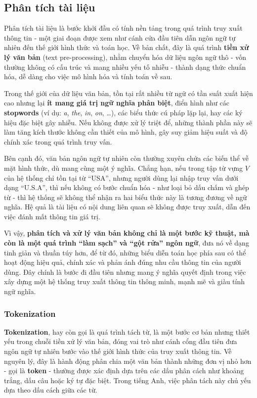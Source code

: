 \subsection{Phân tích tài liệu}
Phân tích tài liệu là bước khởi đầu có tính nền tảng trong quá trình truy xuất thông tin - một giai đoạn được xem như cánh cửa đầu tiên dẫn ngôn ngữ tự nhiên đến thế giới hình thức và toán học. Về bản chất, đây là quá trình \textbf{tiền xử lý văn bản} (text pre-processing), nhằm chuyển hóa dữ liệu ngôn ngữ thô - vốn thường không có cấu trúc và mang nhiều yếu tố nhiễu - thành dạng thức chuẩn hóa, dễ dàng cho việc mô hình hóa và tính toán về sau.

Trong thế giới của dữ liệu văn bản, tồn tại rất nhiều từ ngữ có tần suất xuất hiện cao nhưng lại \textbf{ít mang giá trị ngữ nghĩa phân biệt}, điển hình như các \textbf{stopwords} (ví dụ: \textit{a}, \textit{the}, \textit{in}, \textit{on}, \dots), các biểu thức cú pháp lặp lại, hay các ký hiệu đặc biệt gây nhiễu. Nếu không được xử lý triệt để, những thành phần này sẽ làm tăng kích thước không cần thiết của mô hình, gây suy giảm hiệu suất và độ chính xác trong quá trình truy vấn.

Bên cạnh đó, văn bản ngôn ngữ tự nhiên còn thường xuyên chứa các biến thể về mặt hình thức, dù mang cùng một ý nghĩa. Chẳng hạn, nếu trong tập từ vựng \(V\) của hệ thống chỉ tồn tại từ ``USA'', nhưng người dùng lại nhập truy vấn dưới dạng ``U.S.A'', thì nếu không có bước chuẩn hóa - như loại bỏ dấu chấm và ghép từ - thì hệ thống sẽ không thể nhận ra hai biểu thức này là tương đương về ngữ nghĩa. Hệ quả là tài liệu có nội dung liên quan sẽ không được truy xuất, dẫn đến việc đánh mất thông tin giá trị.

Vì vậy, \textbf{phân tích và xử lý văn bản không chỉ là một bước kỹ thuật, mà còn là một quá trình ``làm sạch'' và ``gột rửa'' ngôn ngữ}, đưa nó về dạng tinh giản và thuần túy hơn, để từ đó, những biểu diễn toán học phía sau có thể hoạt động hiệu quả, chính xác và phản ánh đúng nhu cầu thông tin của người dùng. Đây chính là bước đi đầu tiên nhưng mang ý nghĩa quyết định trong việc xây dựng một hệ thống truy xuất thông tin thông minh, mạnh mẽ và giàu tính ngữ nghĩa.

\subsubsection{Tokenization}
\textbf{Tokenization}, hay còn gọi là quá trình tách từ, là một bước cơ bản nhưng thiết yếu trong chuỗi tiền xử lý văn bản, đóng vai trò như cánh cổng đầu tiên đưa ngôn ngữ tự nhiên bước vào thế giới hình thức của truy xuất thông tin. Về nguyên lý, đây là hành động phân chia một văn bản thành những đơn vị nhỏ hơn - gọi là \textbf{token} - thường được xác định dựa trên các dấu phân cách như khoảng trắng, dấu câu hoặc ký tự đặc biệt. Trong tiếng Anh, việc phân tách này chủ yếu dựa theo dấu cách giữa các từ.

